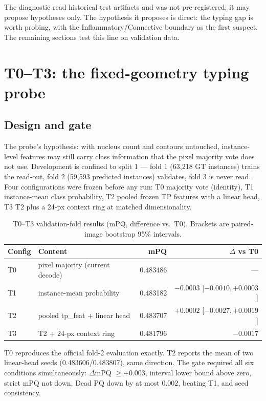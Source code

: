 \documentclass[11pt,a4paper]{article}
\begin{document}
The diagnostic read historical test artifacts and was not pre-registered; it may propose hypotheses only. The hypothesis it proposes is direct: the typing gap is worth probing, with the Inflammatory/Connective boundary as the first suspect. The remaining sections test this line on validation data.

\section{T0--T3: the fixed-geometry typing probe}\label{sec:t}

\subsection{Design and gate}

The probe's hypothesis\cite{specs}: with nucleus count and contours untouched, instance-level features may still carry class information that the pixel majority vote does not use. Development is confined to split 1 --- fold 1 (63,218 GT instances) trains the read-out, fold 2 (59,593 predicted instances) validates, fold 3 is never read. Four configurations were frozen before any run: T0 majority vote (identity), T1 instance-mean class probability, T2 pooled frozen TP features with a linear head, T3 T2 plus a 24-px context ring at matched dimensionality.

\begin{table}[H]
\centering\small
\caption{T0--T3 validation-fold results (mPQ, difference vs.\ T0). Brackets are paired-image bootstrap 95\% intervals.}
\label{tab:t}
\begin{tabular}{llrr}\toprule
Config & Content & mPQ & $\Delta$ vs T0\\\midrule
T0 & pixel majority (current decode) & 0.483486 & ---\\
T1 & instance-mean probability & 0.483182 & $-0.0003$ [$-0.0010,+0.0003$]\\
T2 & pooled tp\_feat + linear head & 0.483707 & $+0.0002$ [$-0.0027,+0.0019$]\\
T3 & T2 + 24-px context ring & 0.481796 & $-0.0017$\\
\bottomrule
\end{tabular}
\end{table}

T0 reproduces the official fold-2 evaluation exactly. T2 reports the mean of two linear-head seeds (0.483606/0.483807), same direction. The gate required all six conditions simultaneously: $\Delta$mPQ $\geq+0.003$, interval lower bound above zero, strict mPQ not down, Dead PQ down by at most $0.002$, beating T1, and seed consistency.
\end{document}
